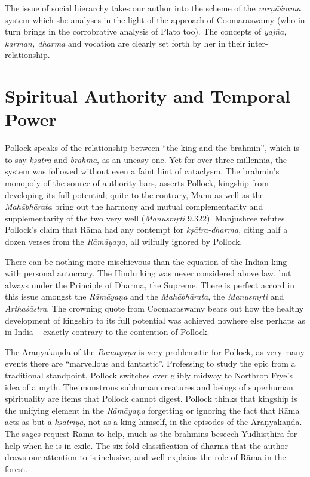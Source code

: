 The issue of social hierarchy takes our author into the scheme of the {\sl varṇāśrama} system which she analyses in the light of the approach of Coomaraswamy (who in turn brings in the corrobrative analysis of Plato too). The concepts of {\sl yajña, karman, dharma} and vocation are clearly set forth by her in their inter-relationship.

\section*{Spiritual Authority and Temporal Power}

Pollock speaks of the relationship between “the king and the brahmin”, which is to say {\sl kṣatra} and {\sl brahma}, as an uneasy one. Yet for over three millennia, the system was followed without even a faint hint of cataclysm. The brahmin's monopoly of the source of authority bars, asserts Pollock, kingship from developing its full potential; quite to the contrary, Manu as well as the {\sl Mahābhārata} bring out the harmony and mutual complementarity and supplementarity of the two very well ({\sl Manusmṛti} 9.322). Manjushree refutes Pollock's claim that Rāma had any contempt for {\sl kṣātra-dharma}, citing half a dozen verses from the {\sl Rāmāyaṇa}, all wilfully ignored by Pollock.

There can be nothing more mischievous than the equation of the Indian king with personal autocracy. The Hindu king was never considered above law, but always under the Principle of Dharma, the Supreme. There is perfect accord in this issue amongst the {\sl Rāmāyaṇa} and the {\sl Mahābhārata}, the {\sl Manusmṛti} and {\sl Arthaśāstra}. The crowning quote from Coomaraswamy bears out how the healthy development of kingship to its full potential was achieved nowhere else perhaps as in India -- exactly contrary to the contention of Pollock.

The Araṇyakāṇda of the {\sl Rāmāyaṇa} is very problematic for Pollock, as very many events there are “marvellous and fantastic”. Professing to study the epic from a traditional standpoint, Pollock switches over glibly midway to Northrop Frye's idea of a myth. The monstrous subhuman creatures and beings of superhuman spirituality are items that Pollock cannot digest. Pollock thinks that kingship is the unifying element in the {\sl Rāmāyaṇa} forgetting or ignoring the fact that Rāma acts as but a {\sl kṣatriya}, not as a king himself, in the episodes of the Araṇyakāṇḍa. The sages request Rāma to help, much as the brahmins beseech Yudhiṣṭhira for help when he is in exile. The six-fold classification of dharma that the author draws our attention to is inclusive, and well explains the role of Rāma in the forest.

